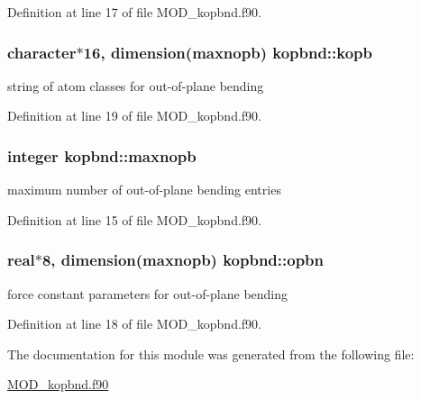 Definition at line 17 of file M\-O\-D\-\_\-kopbnd.\-f90.

\hypertarget{classkopbnd_aaa7892c0e2e0f5fb23376b5faa9d3218}{
\subsubsection[{kopb}]{\setlength{\rightskip}{0pt plus 5cm}character$\ast$16, dimension({\bf maxnopb}) kopbnd\-::kopb}}\label{classkopbnd_aaa7892c0e2e0f5fb23376b5faa9d3218}


string of atom classes for out-\/of-\/plane bending 



Definition at line 19 of file M\-O\-D\-\_\-kopbnd.\-f90.

\hypertarget{classkopbnd_a2c5e12ca853b2a127a2acee645aab0db}{
\subsubsection[{maxnopb}]{\setlength{\rightskip}{0pt plus 5cm}integer kopbnd\-::maxnopb}}\label{classkopbnd_a2c5e12ca853b2a127a2acee645aab0db}


maximum number of out-\/of-\/plane bending entries 



Definition at line 15 of file M\-O\-D\-\_\-kopbnd.\-f90.

\hypertarget{classkopbnd_aea0acd395ea9eed72b7bda8c1f67a44c}{
\subsubsection[{opbn}]{\setlength{\rightskip}{0pt plus 5cm}real$\ast$8, dimension({\bf maxnopb}) kopbnd\-::opbn}}\label{classkopbnd_aea0acd395ea9eed72b7bda8c1f67a44c}


force constant parameters for out-\/of-\/plane bending 



Definition at line 18 of file M\-O\-D\-\_\-kopbnd.\-f90.



The documentation for this module was generated from the following file\-:\begin{DoxyCompactItemize}
\item 
\hyperlink{MOD__kopbnd_8f90}{M\-O\-D\-\_\-kopbnd.\-f90}\end{DoxyCompactItemize}
